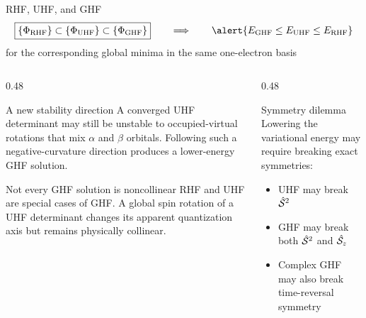 \documentclass[aspectratio=169,9pt]{beamer}
\newcommand{\chS}{\Hat{\mathcal{S}}}
\begin{document}
\begin{frame}{RHF, UHF, and GHF}
	\centering
	\begin{equation*}
		\boxed{
			\{\Phi_\text{RHF}\}
			\subset
			\{\Phi_\text{UHF}\}
			\subset
			\{\Phi_\text{GHF}\}
		}
		\qquad\Longrightarrow\qquad
		\alert{E_\text{GHF}\leq E_\text{UHF}\leq E_\text{RHF}}
	\end{equation*}
	for the corresponding global minima in the same one-electron basis

	\begin{columns}[T,onlytextwidth]
		\begin{column}{0.48\textwidth}
			\begin{block}{A new stability direction}
				A converged UHF determinant may still be unstable to occupied-virtual rotations that mix $\alpha$ and $\beta$ orbitals. Following such a negative-curvature direction produces a lower-energy GHF solution.
			\end{block}

			\begin{block}{Not every GHF solution is noncollinear}
				RHF and UHF are special cases of GHF. A global spin rotation of a UHF determinant changes its apparent quantization axis but remains physically collinear.
			\end{block}
		\end{column}
		\begin{column}{0.48\textwidth}
			\begin{block}{Symmetry dilemma}
				Lowering the variational energy may require breaking exact symmetries:
				\begin{itemize}
					\item UHF may break $\chS^2$
					\item GHF may break both $\chS^2$ and $\chS_z$
					\item Complex GHF may also break time-reversal symmetry
				\end{itemize}
			\end{block}
		\end{column}
	\end{columns}

	\vfill
\end{frame}
\end{document}
